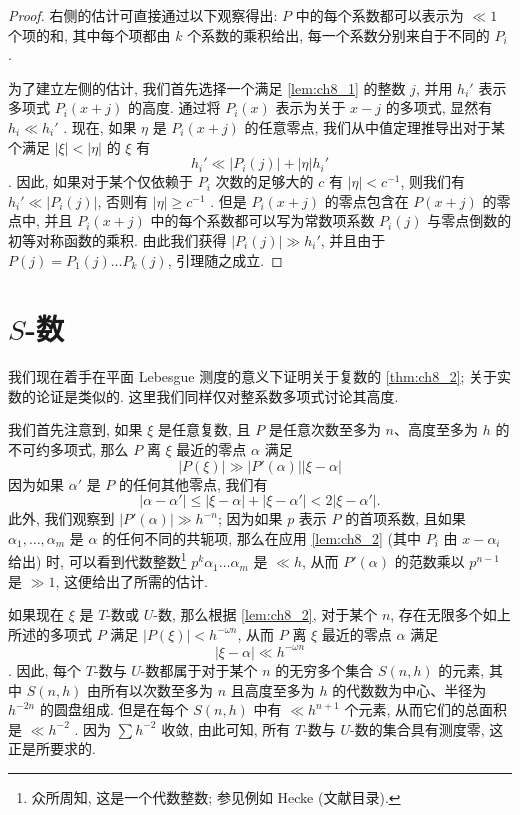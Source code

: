 \begin{proof}
右侧的估计可直接通过以下观察得出: $P$ 中的每个系数都可以表示为 $\ll 1$ 个项的和, 其中每个项都由 $k$ 个系数的乘积给出, 每一个系数分别来自于不同的 $P_i$ .

为了建立左侧的估计, 我们首先选择一个满足 \autoref{lem:ch8_1} 的整数 $j$, 并用 $h_i'$ 表示多项式 $P_i(x+j)$ 的高度. 通过将 $P_i(x)$ 表示为关于 $x-j$ 的多项式, 显然有 $h_i \ll h_i'$ . 现在, 如果 $\eta$ 是 $P_i(x+j)$ 的任意零点, 我们从中值定理推导出对于某个满足 $|\xi| < |\eta|$ 的 $\xi$ 有
\[h_i' \ll |P_i(j)| + |\eta| h_i'\] .
因此, 如果对于某个仅依赖于 $P_i$ 次数的足够大的 $c$ 有 $|\eta| < c^{-1}$, 则我们有 $h_i' \ll |P_i(j)|$, 否则有 $|\eta| \ge c^{-1}$ . 但是 $P_i(x+j)$ 的零点包含在 $P(x+j)$ 的零点中, 并且 $P_i(x+j)$ 中的每个系数都可以写为常数项系数 $P_i(j)$ 与零点倒数的初等对称函数的乘积. 由此我们获得 $|P_i(j)| \gg h_i'$, 并且由于 $P(j) = P_1(j) \dots P_k(j)$, 引理随之成立.
\end{proof}

\section{$S$-数}\label{sec:ch8_5}

我们现在着手在平面 Lebesgue 测度的意义下证明关于复数的 \autoref{thm:ch8_2}; 关于实数的论证是类似的. 这里我们同样仅对整系数多项式讨论其高度.

我们首先注意到, 如果 $\xi$ 是任意复数, 且 $P$ 是任意次数至多为 $n$、高度至多为 $h$ 的不可约多项式, 那么 $P$ 离 $\xi$ 最近的零点 $\alpha$ 满足
\[|P(\xi)| \gg |P'(\alpha)| |\xi - \alpha| \tag{14}\label{eq:ch8_14}\]
因为如果 $\alpha'$ 是 $P$ 的任何其他零点, 我们有
\[|\alpha-\alpha'| \le |\xi-\alpha| + |\xi-\alpha'| < 2|\xi-\alpha'|.\]
此外, 我们观察到 $|P'(\alpha)| \gg h^{-n}$; 因为如果 $p$ 表示 $P$ 的首项系数, 且如果 $\alpha_1, \dots, \alpha_m$ 是 $\alpha$ 的任何不同的共轭项, 那么在应用 \autoref{lem:ch8_2} (其中 $P_i$ 由 $x-\alpha_i$ 给出) 时, 可以看到代数整数\footnote{众所周知, 这是一个代数整数; 参见例如 Hecke (文献目录).} $p^k \alpha_1 \dots \alpha_m$ 是 $\ll h$, 从而 $P'(\alpha)$ 的范数乘以 $p^{n-1}$ 是 $\gg 1$, 这便给出了所需的估计.

如果现在 $\xi$ 是 $T$-数或 $U$-数, 那么根据 \autoref{lem:ch8_2}, 对于某个 $n$, 存在无限多个如上所述的多项式 $P$ 满足 $|P(\xi)| < h^{-\omega n}$, 从而 $P$ 离 $\xi$ 最近的零点 $\alpha$ 满足
\[|\xi-\alpha| \ll h^{-\omega n}\] .
因此, 每个 $T$-数与 $U$-数都属于对于某个 $n$ 的无穷多个集合 $S(n, h)$ 的元素, 其中 $S(n, h)$ 由所有以次数至多为 $n$ 且高度至多为 $h$ 的代数数为中心、半径为 $h^{-2n}$ 的圆盘组成. 但是在每个 $S(n, h)$ 中有 $\ll h^{n+1}$ 个元素, 从而它们的总面积是 $\ll h^{-2}$ . 因为 $\sum h^{-2}$ 收敛, 由此可知, 所有 $T$-数与 $U$-数的集合具有测度零, 这正是所要求的.

